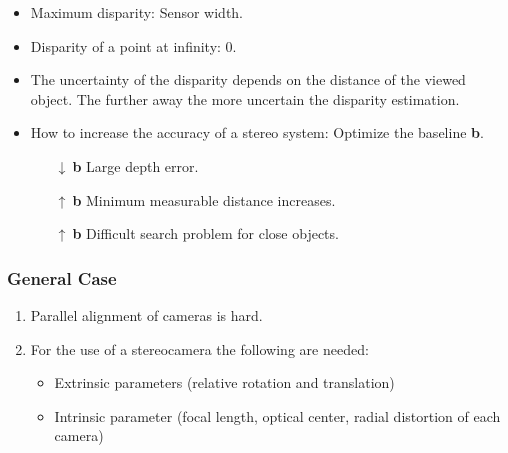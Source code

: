 \documentclass[10pt,a4paper]{scrartcl}
\begin{document}
\begin{multicols*}{2}

\begin{itemize}
\item Maximum disparity: Sensor width.
\item Disparity of a point at infinity: 0.
\item The uncertainty of the disparity depends on the distance of the viewed object. The further away the more uncertain the disparity estimation.
\item How to increase the accuracy of a stereo system: Optimize the baseline \textbf{b}.
\begin{itemize}
\item [$\downarrow\ $\textbf{b}] Large depth error.
\item [$\uparrow\ $\textbf{b}] Minimum measurable distance increases.
\item [$\uparrow\ $\textbf{b}] Difficult search problem for close objects.
\end{itemize}
\end{itemize}

\subsubsection{General Case}


\begin{enumerate}
\item Parallel alignment of cameras is hard.
\item For the use of a stereocamera the following are needed:
\begin{itemize}
\item Extrinsic parameters (relative rotation and translation)
\item Intrinsic parameter (focal length, optical center, radial distortion of each camera)
\end{itemize}
\end{enumerate}


\end{multicols*}
\end{document}
